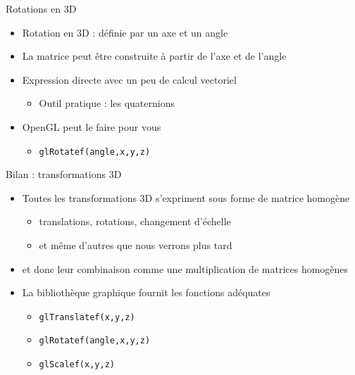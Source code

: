 \begin{frame}{Rotations en 3D}
\begin{itemize}
\item Rotation en 3D : définie par un axe et un angle
\item La matrice peut être construite à partir de l'axe et de l'angle
\item Expression directe avec un peu de calcul vectoriel
\begin{itemize}
\item Outil pratique : les quaternions
\end{itemize}
\item OpenGL peut le faire pour vous
\begin{itemize}
\item \texttt{glRotatef(angle,x,y,z)}
\end{itemize}
\end{itemize}
\end{frame}

\begin{frame}{Bilan : transformations 3D}
\begin{itemize}
\item Toutes les transformations 3D s'expriment sous forme de matrice homogène
\begin{itemize}
\item translations, rotations, changement d'échelle
\item et même d'autres que nous verrons plus tard
\end{itemize}
\item et donc leur combinaison comme une multiplication de matrices homogènes
\item La bibliothèque graphique fournit les fonctions adéquates
\begin{itemize}
\item \texttt{glTranslatef(x,y,z)}
\item \texttt{glRotatef(angle,x,y,z)}
\item \texttt{glScalef(x,y,z)}
\end{itemize}
\end{itemize}
\end{frame}

